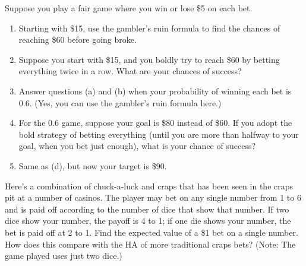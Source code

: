\documentclass[12pt,letterpaper]{hmcpset}
\begin{document}
\begin{problem}[1]
  Suppose you play a fair game where you win or lose \$5 on each bet.
  \begin{enumerate}[label=(\alph*)]
  \item Starting with \$15, use the gambler's ruin formula to find the chances of reaching \$60 before going broke.
  \item Suppose you start with \$15, and you boldly try to reach \$60 by betting everything twice in a row. What are your chances of success?
  \item Answer questions (a) and (b) when your probability of winning each bet is 0.6. (Yes, you can use the gambler’s ruin formula here.) 
  \item For the 0.6 game, suppose your goal is \$80 instead of \$60. If you adopt the bold strategy of betting everything (until you are more than halfway to your goal, when you bet just enough), what is your chance of success?
  \item Same as (d), but now your target is \$90.
  \end{enumerate}
\end{problem}
\begin{solution}

\end{solution}
\pagebreak
\begin{problem}[Bollman 5.2]
  Here’s a combination of chuck-a-luck and craps that has been seen in the craps pit at a number of casinos.
  The player may bet on any single number from 1 to 6 and is paid off according to the number of dice that show that number.
  If two dice show your number, the payoff is 4 to 1; if one die shows your number, the bet is paid off at 2 to 1.
  Find the expected value of a \$1 bet on a single number.
  How does this compare with the HA of more traditional craps bets?
  (Note: The game played uses just two dice.)
\end{problem}
\begin{solution}

\end{solution}
\pagebreak
\end{document}
